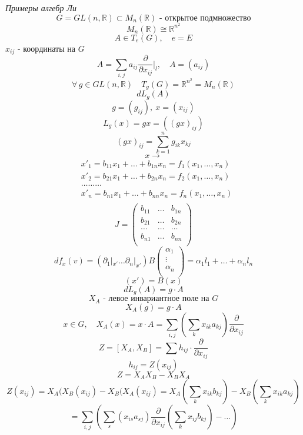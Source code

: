 \documentclass[a4paper]{article}
\theoremstyle{definition}
\theoremstyle{remark}
\begin{document}
\emph{Примеры алгебр Ли}
\[
    G = GL(n, \mathbb{R}) \subset M_n(\mathbb{R}) \text{ - открытое подмножество}
\]
\[
    M_n(\mathbb{R}) \cong \mathbb{R}^{n^2}
\]
\[
    A \in T_e(G),  \quad e = E
\]
$ x_{ij} $ - координаты на $ G $ 
\[
    A = \sum_{i,j} a_{ij} \frac{\partial}{\partial x_{ij}} \Bigg|_l,
    \quad A = (a_{ij})
\]
\[
    \forall \, g \in GL(n, \mathbb{R}) \quad T_g(G) = \mathbb{R}^{n^2} = M_n(\mathbb{R})
\]
\[
    dL_g(A)
\]
\[
     g = (g_{ij}), \ x = (x_{ij})
\]
\[
    L_g(x) = gx = ((gx)_{ij})
\]
\[
    (gx)_{ij} = \sum_{k=1}^{n} g_{ik} x_{kj}
\]
\[
    x \to  
\]
\[
    \begin{aligned}
        &x'_1 = b_{11} x_1 + \dots + b_{1n}x_n = f_1(x_1,\dots,x_n)\\
        &x'_2 = b_{21} x_1 + \dots + b_{2n}x_n= f_2(x_1,\dots,x_n)\\
        &\dots\dots\dots\\
        &x'_n = b_{n1} x_1 + \dots + b_{nn}x_n= f_n(x_1,\dots,x_n)\\
    \end{aligned}
\]
\[
    J = \begin{pmatrix}
    b_{11} & \dots & b_{1n}\\
    b_{21} & \dots & b_{2n}\\
    \dots & \dots & \dots\\
    b_{n1} & \dots & b_{nn}\\
    
    \end{pmatrix}
\]
\[
    df_x(v) = (\partial_1 |_{x'} \dots \partial_n|_{x'}) B
    \begin{pmatrix}
    \alpha_1\\
    \vdots\\
    \alpha_n\\
    
    \end{pmatrix}
    = \alpha_1 l_1 + \dots + \alpha_n l_n
\]
\[
    (x') = B(x)
\]
\[
    dL_g(A) = g \cdot A
\]
\[
    X_A \text{ - левое инвариантное поле на } G
\]
\[
    X_A(g) = g \cdot A
\]
\[
    x \in G, \quad X_A(x) = x \cdot A =
    \sum_{i,j} \left( \sum_{k} x_{ik} a_{kj} \right) \frac{\partial}{\partial x_{ij}} 
\]
\[
    Z = [X_A, X_B] = \sum h_{ij} \cdot \frac{\partial}{\partial x_{ij}} 
\]
\[
    h_{ij} = Z(x_{ij})
\]
\[
    Z = X_A X_B - X_B X_A
\]
\[
    Z(x_{ij}) = X_A(X_B(x_{ij}) - X_B(X_A(x_{ij}) = 
    X_A\left(\sum_{k} x_{ik}b_{kj}\right) - X_B\left(\sum_{k} x_{ik} a_{kj}\right)
\]
\[
    = \sum_{i,j} \left( \sum_{s} (x_{is} a_{sj}) \frac{\partial}{\partial x_{ij}} 
    \left( \sum_{k} x_{ij}b_{kj}\right) - \dots \right)
\]
\end{document}
